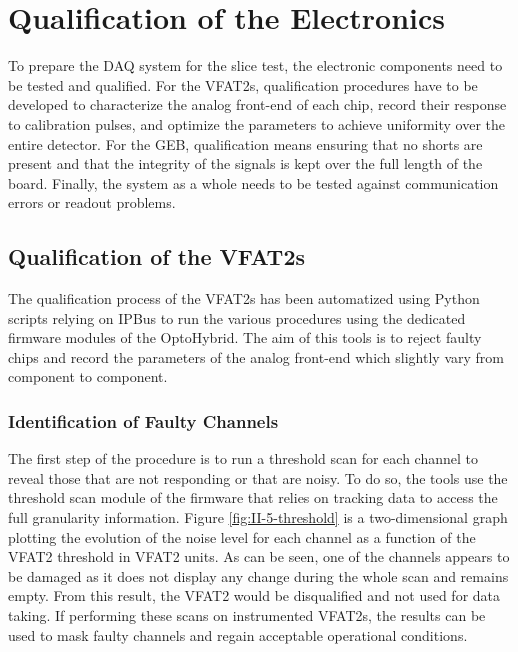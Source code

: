 \chapter{Qualification of the Electronics}
\label{chap:II-5-qualification}

  To prepare the DAQ system for the slice test, the electronic components need to be tested and qualified. For the VFAT2s, qualification procedures have to be developed to characterize the analog front-end of each chip, record their response to calibration pulses, and optimize the parameters to achieve uniformity over the entire detector. For the GEB, qualification means ensuring that no shorts are present and that the integrity of the signals is kept over the full length of the board. Finally, the system as a whole needs to be tested against communication errors or readout problems.

  \section{Qualification of the VFAT2s}

    The qualification process of the VFAT2s has been automatized using Python scripts relying on IPBus to run the various procedures using the dedicated firmware modules of the OptoHybrid. The aim of this tools is to reject faulty chips and record the parameters of the analog front-end which slightly vary from component to component.

    \subsection{Identification of Faulty Channels}

      The first step of the procedure is to run a threshold scan for each channel to reveal those that are not responding or that are noisy. To do so, the tools use the threshold scan module of the firmware that relies on tracking data to access the full granularity information. Figure \ref{fig:II-5-threshold} is a two-dimensional graph plotting the evolution of the noise level for each channel as a function of the VFAT2 threshold in VFAT2 units. As can be seen, one of the channels appears to be damaged as it does not display any change during the whole scan and remains empty. From this result, the VFAT2 would be disqualified and not used for data taking. If performing these scans on instrumented VFAT2s, the results can be used to mask faulty channels and regain acceptable operational conditions.

